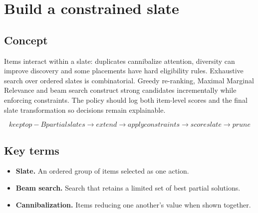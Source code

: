 \section{Build a constrained slate}

\begin{abstract}
The best page is not simply the individually highest-scoring items.
\end{abstract}

\subsection{Concept}
Items interact within a slate: duplicates cannibalize attention, diversity can improve discovery and some placements have hard eligibility rules. Exhaustive search over ordered slates is combinatorial. Greedy re-ranking, Maximal Marginal Relevance and beam search construct strong candidates incrementally while enforcing constraints. The policy should log both item-level scores and the final slate transformation so decisions remain explainable.

\begin{equation*}
keep top-B partial slates \rightarrow extend \rightarrow apply constraints \rightarrow score slate \rightarrow prune
\end{equation*}

\subsection{Key terms}
\begin{itemize}
\item \textbf{Slate.} An ordered group of items selected as one action.
\item \textbf{Beam search.} Search that retains a limited set of best partial solutions.
\item \textbf{Cannibalization.} Items reducing one another’s value when shown together.
\end{itemize}
